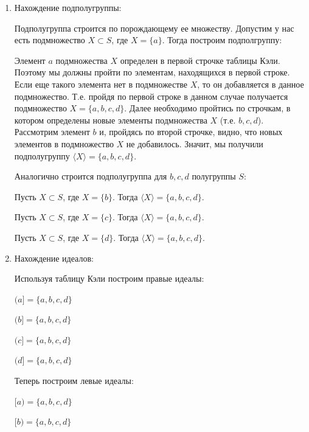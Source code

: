\documentclass[spec, och, labwork]{shiza}
\begin{document}
    \begin{enumerate}
      \item Нахождение подполугруппы:
    
      Подполугруппа строится по порождающему ее множеству. Допустим у нас есть подмножество $X \subset S$, где $X = \{ a\}$. 
      Тогда построим подполгруппу:
  
      Элемент $a$ подмножества $X$ определен в первой строчке таблицы Кэли. Поэтому мы должны пройти по элементам, находящихся в первой
      строке. Если еще такого элемента нет в подмножестве $X$, то он добавляется в данное подмножество. Т.е. пройдя по первой строке в
      данном случае получается подмножество $X = \{a, b, c, d\}$. Далее необходимо пройтись по строчкам, в котором определены новые элементы
      подмножества $X$ (т.е. $b, c, d$). Рассмотрим элемент $b$ и, пройдясь по второй строчке, видно, что новых элементов в подмножество $X$
      не добавилось. Значит, мы получили подполугруппу $\langle X \rangle = \{a, b, c, d\}$.  

      Аналогично строится подполугруппа для $b,c,d$ полугруппы $S$:

      Пусть $X \subset S$, где $X = \{b\}$. Тогда $\langle X \rangle = \{a, b, c, d\}$.

      Пусть $X \subset S$, где $X = \{c\}$. Тогда $\langle X \rangle = \{a, b, c, d\}$.

      Пусть $X \subset S$, где $X = \{d\}$. Тогда $\langle X \rangle = \{a, b, c, d\}$.
      
      \item Нахождение идеалов:
      
      Используя таблицу Кэли построим правые идеалы:
      
      \begin{center}

        $(a] = \{a, b, c, d\}$

        $(b] = \{a, b, c, d\}$
  
        $(c] = \{a, b, c, d\}$
  
        $(d] = \{a, b, c, d\}$
    
      \end{center}
    
      
      Теперь построим левые идеалы:

      \begin{center}
      
        $[a) = \{a, b, c, d\}$

        $[b) = \{a, b, c, d\}$


\end{center}
\end{enumerate}
\end{document}
